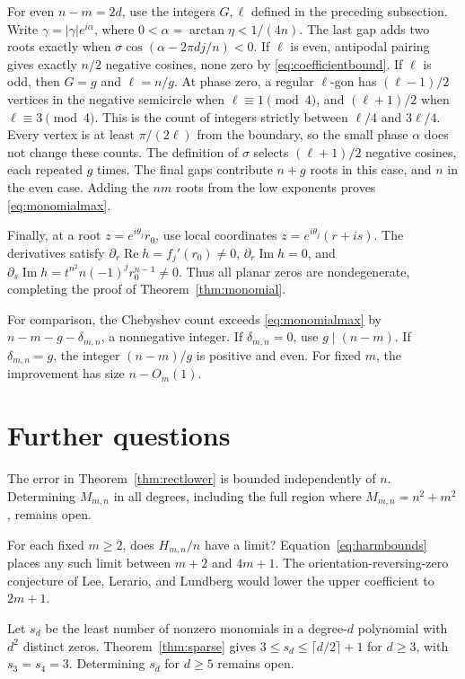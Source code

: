 \documentclass[a4paper]{amsart}
\theoremstyle{remark}
\DeclareMathOperator{\Rea}{Re}
\DeclareMathOperator{\Ima}{Im}
\begin{document}
For even \(n-m=2d\), use the integers \(G,\ell\)
defined in the preceding subsection. Write
\(\gamma=|\gamma|e^{i\alpha}\), where
\(0<\alpha=\arctan\eta<1/(4n)\).
The last gap adds two roots exactly when
\(\sigma\cos(\alpha-2\pi dj/n)<0\).
If \(\ell\) is even, antipodal pairing gives exactly
\(n/2\) negative cosines, none zero by
\eqref{eq:coefficientbound}.
If \(\ell\) is odd, then \(G=g\) and \(\ell=n/g\).
At phase zero, a regular \(\ell\)-gon has
\((\ell-1)/2\) vertices in the negative semicircle
when \(\ell\equiv1\pmod4\), and \((\ell+1)/2\)
when \(\ell\equiv3\pmod4\).
This is the count of integers strictly between
\(\ell/4\) and \(3\ell/4\).
Every vertex is at least \(\pi/(2\ell)\) from the
boundary, so the small phase \(\alpha\) does not
change these counts. The definition of \(\sigma\)
selects \((\ell+1)/2\) negative cosines, each
repeated \(g\) times. The final gaps contribute
\(n+g\) roots in this case, and \(n\) in the even
case. Adding the \(nm\) roots from the low
exponents proves \eqref{eq:monomialmax}.

Finally, at a root \(z=e^{i\theta_j}r_0\), use local
coordinates \(z=e^{i\theta_j}(r+is)\).
The derivatives satisfy
\(\partial_r\Rea h=f_j'(r_0)\ne0\),
\(\partial_r\Ima h=0\), and
\(\partial_s\Ima h=t^{n^2}n(-1)^jr_0^{n-1}\ne0\).
Thus all planar zeros are nondegenerate, completing
the proof of Theorem~\ref{thm:monomial}.

For comparison, the Chebyshev count exceeds
\eqref{eq:monomialmax} by
\(n-m-g-\delta_{m,n}\), a nonnegative integer.
If \(\delta_{m,n}=0\), use \(g\mid(n-m)\).
If \(\delta_{m,n}=g\), the integer \((n-m)/g\)
is positive and even. For fixed \(m\), the improvement
has size \(n-O_m(1)\).

\section{Further questions}\label{sec:questions}

The error in Theorem~\ref{thm:rectlower} is bounded independently
of \(n\). Determining \(M_{m,n}\) in all degrees, including the
full region where \(M_{m,n}=n^2+m^2\), remains open.

For each fixed \(m\ge2\), does \(H_{m,n}/n\) have a limit?
Equation~\eqref{eq:harmbounds} places any such limit between
\(m+2\) and \(4m+1\). The orientation-reversing-zero conjecture
of Lee, Lerario, and Lundberg \cite{LLL15} would lower the
upper coefficient to \(2m+1\).

Let \(s_d\) be the least number of nonzero monomials in a
degree-\(d\) polynomial with \(d^2\) distinct zeros.
Theorem~\ref{thm:sparse} gives
\(3\le s_d\le\lceil d/2\rceil+1\) for \(d\ge3\), with
\(s_3=s_4=3\). Determining \(s_d\) for \(d\ge5\) remains open.
\end{document}
